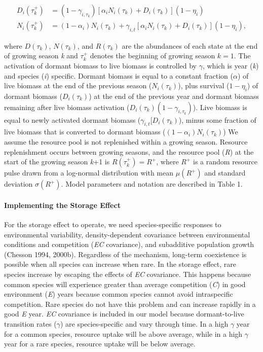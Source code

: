 \documentclass[12pt,]{article}
\begin{document}
\begin{align}
  D_{i}(\tau_k^+) &= (1-\gamma_{i,\tau_k})[\alpha_i N_{i}(\tau_k) + D_{i}(\tau_k)](1-\eta_i) \\
  N_{i}(\tau_k^+) &= (1-\alpha_i)N_{i}(\tau_k) + \gamma_{i,t}[\alpha_i N_{i}(\tau_k) + D_{i}(\tau_k)] (1-\eta_i),
\end{align}

\noindent where \(D(\tau_k)\), \(N(\tau_k)\), and \(R(\tau_k)\) are the
abundances of each state at the end of growing season \emph{k} and
\(\tau_k^+\) denotes the beginning of growing season \(k=1\). The
activation of dormant biomass to live biomass is controlled by
\(\gamma\), which is year (\emph{k}) and species (\emph{i}) specific.
Dormant biomass is equal to a constant fraction (\(\alpha\)) of live
biomass at the end of the previous season (\(N_{i}(\tau_k)\)), plus
survival (\(1-\eta_i\)) of dormant biomass (\(D_{i}(\tau_k)\)) at the
end of the previous year and dormant biomass remaining after live
biomass activation (\(D_{i}(\tau_k)(1-\gamma_{i,\tau_k})\)). Live
biomass is equal to newly activated dormant biomass
(\(\gamma_{i,t}[D_{i}(\tau_k)\)), minus some fraction of live biomass
that is converted to dormant biomass (\((1-\alpha_i)N_{i}(\tau_k)\)) We
assume the resource pool is not replenished within a growing season.
Resource replenishment occurs between growing seasons, and the resource
pool (\emph{R}) at the start of the growing season \emph{k}+1 is
\(R(\tau_k^+) = R^+\), where \(R^+\) is a random resource pulse drawn
from a log-normal distribution with mean \(\mu(R^+)\) and standard
deviation \(\sigma(R^+)\). Model parameters and notation are described
in Table 1.

\paragraph{Implementing the Storage
Effect}\label{implementing-the-storage-effect}

For the storage effect to operate, we need species-specific responses to
environmental variability, density-dependent covariance between
environmental conditions and competition (\emph{EC} covariance), and
subadditive population growth (Chesson 1994, 2000b). Regardless of the
mechanism, long-term coexistence is possible when all species can
increase when rare. In the storage effect, rare species increase by
escaping the effects of \emph{EC} covariance. This happens because
common species will experience greater than average competition
(\emph{C}) in good environment (\emph{E}) years because common species
cannot avoid intraspecific competition. Rare species do not have this
problem and can increase rapidly in a good \emph{E} year. \emph{EC}
covariance is included in our model because dormant-to-live transition
rates (\(\gamma\)) are species-specific and vary through time. In a high
\(\gamma\) year for a common species, resource uptake will be above
average, while in a high \(\gamma\) year for a rare species, resource
uptake will be below average.
\end{document}

